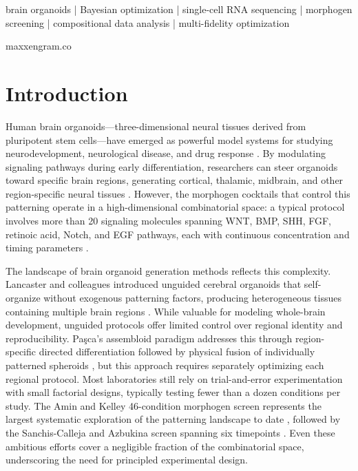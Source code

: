 \documentclass[times,twoside]{zHenriquesLab-StyleBioRxiv}
\begin{document}
\begin{keywords}
brain organoids | Bayesian optimization | single-cell RNA sequencing | morphogen screening | compositional data analysis | multi-fidelity optimization
\end{keywords}

\begin{corrauthor}
maxx\at engram.co
\end{corrauthor}

\linenumbers

\section*{Introduction}

\lettrine{H}{}uman brain organoids---three-dimensional neural tissues derived from pluripotent stem cells---have emerged as powerful model systems for studying neurodevelopment, neurological disease, and drug response \cite{Lancaster2013, Pasca2019, Eze2021}. By modulating signaling pathways during early differentiation, researchers can steer organoids toward specific brain regions, generating cortical, thalamic, midbrain, and other region-specific neural tissues \cite{Amin2024}. However, the morphogen cocktails that control this patterning operate in a high-dimensional combinatorial space: a typical protocol involves more than 20 signaling molecules spanning WNT, BMP, SHH, FGF, retinoic acid, Notch, and EGF pathways, each with continuous concentration and timing parameters \cite{Amin2024, SanchisCalleja2025}.

The landscape of brain organoid generation methods reflects this complexity. Lancaster and colleagues introduced unguided cerebral organoids that self-organize without exogenous patterning factors, producing heterogeneous tissues containing multiple brain regions \cite{Lancaster2013}. While valuable for modeling whole-brain development, unguided protocols offer limited control over regional identity and reproducibility. Pa\c{s}ca's assembloid paradigm addresses this through region-specific directed differentiation followed by physical fusion of individually patterned spheroids \cite{Pasca2019}, but this approach requires separately optimizing each regional protocol. Most laboratories still rely on trial-and-error experimentation with small factorial designs, typically testing fewer than a dozen conditions per study. The Amin and Kelley 46-condition morphogen screen represents the largest systematic exploration of the patterning landscape to date \cite{Amin2024}, followed by the Sanchis-Calleja and Azbukina screen spanning six timepoints \cite{SanchisCalleja2025}. Even these ambitious efforts cover a negligible fraction of the combinatorial space, underscoring the need for principled experimental design.
\end{document}
